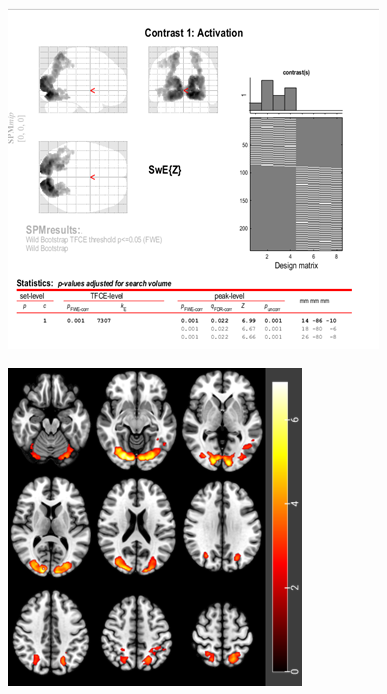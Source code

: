 \documentclass[a4paper,fleqn]{cas-sc}
\begin{document}
\begin{figure}[ht]
    \centering
    \begin{minipage}{0.48\textwidth}
        \centering
        \includegraphics[clip, trim=0 0 0 0, width=\linewidth]{figs/YA_spm.png} %
         \label{fig:a}
    \end{minipage}
    \begin{minipage}{0.48\textwidth}
        \centering
        \includegraphics[clip, trim=0 0 0 0, width=\linewidth]{figs/YA_slice.png} %

\end{minipage}
\end{figure}
\end{document}
